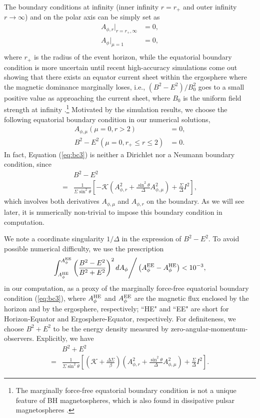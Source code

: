 \documentclass[aps,prd,reprint,nofootinbib, superscriptaddress]{revtex4-1}
\def\sst{\sin^2\theta}
\def\Ar{A_{\phi,r}}
\def\Am{A_{\phi,\mu}}
\def\be{\begin{equation}}
\def\ee{\end{equation}}
\def\AHE{A_\phi^{\rm HE}}
\def\AEE{A_\phi^{\rm EE}}
\begin{document}
The boundary conditions at infinity (inner infinity $r=r_+$ and outer infinity $r\rightarrow\infty$)
and on the polar axis can be simply set as
\be
\begin{aligned}
\Ar|_{r=r_+, \infty} &= 0, \\
A_\phi|_{\mu = 1} &= 0,\\
\end{aligned}
\ee
where $r_+$ is the radius of the event horizon,
while the equatorial boundary condition is more uncertain until recent high-accuracy simulations
come out showing that there exists an equator current sheet within the ergosphere where the
magnetic dominance marginally loses, i.e., $(B^2-E^2)/B_0^2$ goes to a small positive value
as approaching the current sheet, where $B_0$ is the uniform field strength
at infinity  \cite{East2018}.\footnote{The marginally force-free equatorial boundary condition
is not a unique feature of BH magnetospheres, which is also found in dissipative pulsar magnetospheres
\cite[see e.g.][]{Gruzinov2008, Gruzinov2011}.}
Motivated by the simulation results,
we choose the following equatorial boundary condition in our numerical solutions,
\begin{subequations}
\begin{align}
    \Am(\mu = 0, r > 2) &= 0, \label{eq:bc2}\\
    B^2-E^2 (\mu = 0, r_+ \leq r \leq 2) &=0.\label{eq:bc3}
\end{align}
\end{subequations}
In fact, Equation (\ref{eq:bc3})
is neither a Dirichlet nor a Neumann boundary condition, since
\be
\begin{aligned}
&B^2-E^2 \label{eq:B2mE2}\\
= & \frac{1}{\Sigma \sst} \left[ -\mathcal{K} \left(\Ar^2 +\frac{\sst}{\Delta}\Am^2 \right)+\frac{\Sigma}{\Delta}I^2\right],
\end{aligned}
\ee
which involves both derivatives $\Am$ and $\Ar$ on the boundary.
As we will see later, it is numerically non-trivial to impose this boundary condition in computation.

We note a coordinate singularity $1/\Delta$ in the expression of $B^2-E^2$.
To avoid possible numerical difficulty, we use the prescription
\be
\label{eq:nbc}
\int_{A_\phi^{\rm HE}}^{A_\phi^{\rm EE}} \left(\frac{B^2-E^2}{B^2+E^2}\right)^2 dA_\phi \Bigg/ \left(A_\phi^{\rm EE}- A_\phi^{\rm HE}\right)  < 10^{-3},
\ee
in our computation, as a proxy of the marginally force-free equatorial boundary condition (\ref{eq:bc3}),
where $\AHE$ and $\AEE$ are the magnetic flux enclosed by the horizon and by the ergosphere, respectively;
``HE" and ``EE" are short for Horizon-Equator and Ergosphere-Equator, respectively.
For definiteness, we choose $B^2+E^2$ to be the energy density measured by zero-angular-momentum-observers.
Explicitly, we have
\be
\begin{aligned}
 & B^2+E^2   \\
=& \frac{1}{\Sigma \sst} \left[ \left(\mathcal{K}+\frac{\Delta\Sigma}{\beta} \right)
 \left(\Ar^2 +\frac{\sst}{\Delta}\Am^2 \right)
 +\frac{\Sigma}{\Delta}I^2\right] .
\end{aligned}
\ee
\end{document}

